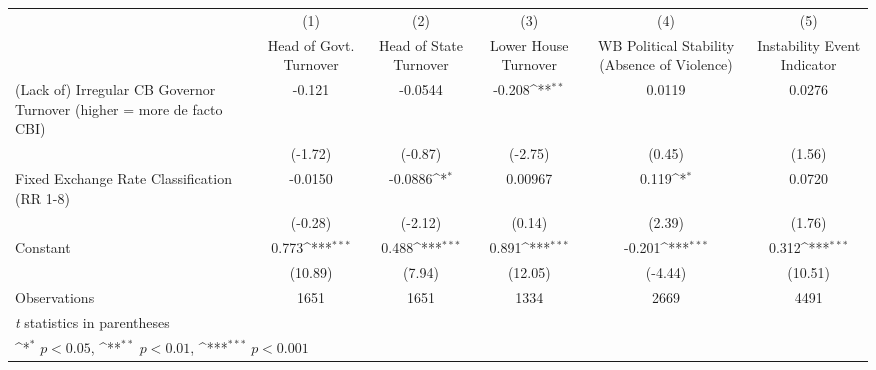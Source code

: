 {
\def\sym#1{\ifmmode^{#1}\else\(^{#1}\)\fi}
\begin{tabular*}{\linewidth}{@{\hskip\tabcolsep\extracolsep\fill}l*{5}{c}}
\hline\hline
                &\multicolumn{1}{c}{(1)}&\multicolumn{1}{c}{(2)}&\multicolumn{1}{c}{(3)}&\multicolumn{1}{c}{(4)}&\multicolumn{1}{c}{(5)}\\
                &\multicolumn{1}{c}{Head of Govt. Turnover}&\multicolumn{1}{c}{Head of State Turnover}&\multicolumn{1}{c}{Lower House Turnover}&\multicolumn{1}{c}{WB Political Stability (Absence of Violence)}&\multicolumn{1}{c}{Instability Event Indicator}\\
\hline
(Lack of) Irregular CB Governor Turnover (higher = more de facto CBI)&   -0.121         &  -0.0544         &   -0.208\sym{**} &   0.0119         &   0.0276         \\
                &  (-1.72)         &  (-0.87)         &  (-2.75)         &   (0.45)         &   (1.56)         \\
[1em]
Fixed Exchange Rate Classification (RR 1-8)&  -0.0150         &  -0.0886\sym{*}  &  0.00967         &    0.119\sym{*}  &   0.0720         \\
                &  (-0.28)         &  (-2.12)         &   (0.14)         &   (2.39)         &   (1.76)         \\
[1em]
Constant        &    0.773\sym{***}&    0.488\sym{***}&    0.891\sym{***}&   -0.201\sym{***}&    0.312\sym{***}\\
                &  (10.89)         &   (7.94)         &  (12.05)         &  (-4.44)         &  (10.51)         \\
\hline
Observations    &     1651         &     1651         &     1334         &     2669         &     4491         \\
\hline\hline
\multicolumn{6}{l}{\footnotesize \textit{t} statistics in parentheses}\\
\multicolumn{6}{l}{\footnotesize \sym{*} \(p<0.05\), \sym{**} \(p<0.01\), \sym{***} \(p<0.001\)}\\
\end{tabular*}
}
